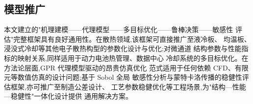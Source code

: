 \subsection{模型推广}

本文建立的"机理建模——代理模型——多目标优化——鲁棒决策——敏感性
评估"完整框架具有良好通用性。在散热领域,该框架可直接推广至液冷板、
均温板、浸没式冷却等其他电子散热构型的参数化设计与优化;对微通道
结构参数与性能指标的映射关系,同样适用于动力电池热管理、数据中心
冷却系统的多目标优化。在方法论层面,GPR 代理模型驱动的昂贵仿真优化
范式适用于任何依赖 CFD、有限元等数值仿真的设计问题;基于 Sobol 全局
敏感性分析与蒙特卡洛传播的稳健性评估框架,亦可推广至制造公差设计、
工艺参数稳健优化等工程场景,为"结构—性能—稳健性"一体化设计提供
通用解决方案。

